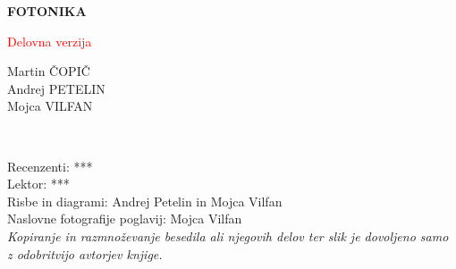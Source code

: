 \documentclass[11pt,fleqn]{book} %
\begin{document}
\let\cleardoublepage\clearpage
\makeatletter
\setlength{\@fptop}{0pt}
\makeatother




\begingroup
\thispagestyle{empty}
\centering
\vspace*{5cm}
\par\normalfont\fontsize{35}{35}\sffamily\selectfont
\textbf{FOTONIKA}\\
{\LARGE }\par %
\vspace*{1cm}
\vspace*{1cm}
{\LARGE \textcolor{red}{Delovna verzija}\\}\par
\vspace*{8cm}
{\Large Martin ČOPIČ \\Andrej PETELIN \\Mojca VILFAN \\}\par %
\endgroup


\newpage
~\vfill
\thispagestyle{empty}


 Recenzenti: {***}\\ %

 Lektor: {***}\\ %

 Risbe in diagrami: Andrej Petelin in Mojca Vilfan\\ %

 Naslovne fotografije poglavij: Mojca Vilfan\\ %

 \textit{\textcopyright 
Kopiranje in razmnoževanje besedila ali njegovih delov ter slik je 
dovoljeno samo z odobritvijo avtorjev knjige.} \\%
\end{document}
